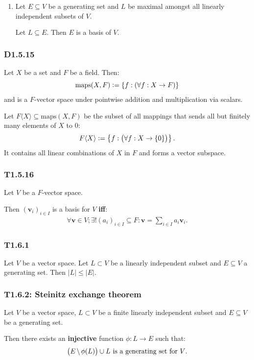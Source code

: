 \documentclass{article}
\newcommand{\deq}{\vcentcolon=}
\newcommand{\vc}[1]{\boldsymbol{#1}}
\begin{document}
\begin{multicols*}{3}
\begin{enumerate}
    \item Let $E\subseteq V$ be a generating set and
    $L$ be maximal amongst all linearly independent
    subsets of $V$. 
    
    Let $L\subseteq E$. Then $E$ is a basis of $V$.
\end{enumerate}

\subsubsection*{D1.5.15}
Let $X$ be a set and $F$ be a field. Then:
$$\text{maps}(X,F)\deq\{f:(\forall f:X\rightarrow F)\}$$
and is a $F$-vector space under pointwise addition and
multiplication via scalars.

Let $F\langle X\rangle\subseteq\text{maps}(X,F)$ be
the subset of all mappings that sends all but finitely many
elements of $X$ to $0$:
$$F\langle X\rangle\deq
\left\{f:\bigl(\forall f:X\rightarrow\{0\}\bigr)\right\}.$$
It contains all linear combinations of $X$
in $F$ and forms a vector subspace.

\subsubsection*{T1.5.16}
Let $V$ be a $F$-vector space.

Then $(\vc{v}_i)_{i\in I}$ is a basis for $V$ \textbf{if{}f}:
\begin{align*}
    \forall\vc{v}\in V;\exists!(a_i)_{i\in I}\subseteq F:
    \vc{v}=\sum_{i\in I}a_i\vc{v}_i.
\end{align*}

\subsubsection*{T1.6.1}
Let $V$ be a vector space.
Let $L\subset V$ be a linearly independent subset
and $E\subseteq V$ a generating set.
Then $|L|\leq|E|$.

\subsubsection*{T1.6.2: Steinitz exchange theorem}
Let $V$ be a vector space, $L\subset V$ be a finite
linearly independent subset and $E\subseteq V$
be a generating set.

Then there exists an \textbf{injective} function
$\phi:L\rightarrow E$ such that:
$$\bigl(E\hspace{0.02in}\backslash\hspace{0.02in}
\phi(L)\bigr)\cup L
\hspace{0.05in}\text{is a generating set for $V$.}$$


\end{multicols*}
\end{document}
